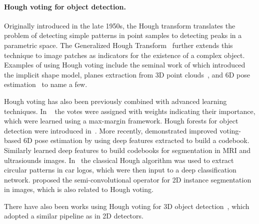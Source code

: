 \documentclass[10pt,twocolumn,letterpaper]{article}
\begin{document}
\paragraph{Hough voting for object detection.}
Originally introduced in the late 1950s, the Hough transform \cite{hough1959machine} translates the problem of detecting simple patterns in point samples to detecting peaks in a parametric space. The Generalized Hough Transform~\cite{ballard1981generalizing} further extends this technique to image patches as indicators for the existence of a complex object. Examples of using Hough voting include the seminal work of \cite{leibe2008robust} which introduced the implicit shape model, planes extraction from 3D point clouds~\cite{borrmann20113d}, and 6D pose estimation~\cite{sun2010depth} to name a few. 


Hough voting has also been previously combined with advanced learning techniques. In ~\cite{maji2009object} the votes were assigned with weights indicating their importance, which were learned using a max-margin framework.  
Hough forests for object detection were introduced in~\cite{gall2011hough,gall2013class}. More recently, \cite{kehl2016deep} demonstrated improved voting-based 6D pose estimation by using deep features extracted to build a codebook. Similarly \cite{milletari2017hough} learned deep features to build codebooks for segmentation in MRI and ultrasiounds images. In~\cite{huan2017vehicle} the classical Hough algorithm was used to extract circular patterns in car logos, which were then input to a deep classification network.
\cite{novotny2018semi} proposed the semi-convolutional operator for 2D instance segmentation in images, which is also related to Hough voting.

There have also been works using Hough voting for 3D object detection~\cite{woodford2014demisting,knopp2010orientation,velizhev2012implicit,knopp2011scene}, which adopted a similar pipeline as in 2D detectors.
\end{document}
